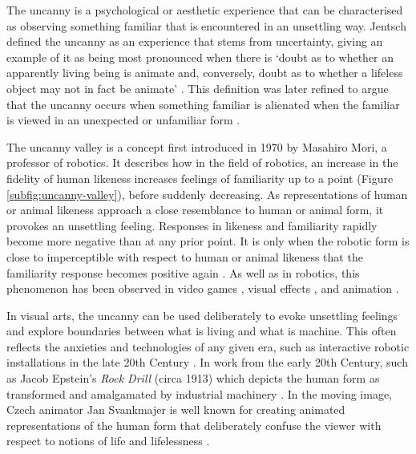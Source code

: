 The uncanny is a psychological or aesthetic experience that can be characterised as observing something familiar that is encountered in an unsettling way. 
Jentsch defined the uncanny as an experience that stems from uncertainty, giving an example of it as being most pronounced when there is `doubt as to whether an apparently living being is animate and, conversely, doubt as to whether a lifeless object may not in fact be animate' \citep{jentsch1906psychology}. 
This definition was later refined to argue that the uncanny occurs when something familiar is alienated when the familiar is viewed in an unexpected or unfamiliar form \citep{freud1919uncanny}.

The uncanny valley is a concept first introduced in 1970 by Masahiro Mori, a professor of robotics. 
It describes how in the field of robotics, an increase in the fidelity of human likeness increases feelings of familiarity up to a point (Figure \ref{subfig:uncanny-valley}), before suddenly decreasing. 
As representations of human or animal likeness approach a close resemblance to human or animal form, it provokes an unsettling feeling. 
Responses in likeness and familiarity rapidly become more negative than at any prior point. 
It is only when the robotic form is close to imperceptible with respect to human or animal likeness that the familiarity response becomes positive again \citep{mori1970uncanny}. 
As well as in robotics, this phenomenon has been observed in video games \citep{ratajczyk2019uncanny}, visual effects \citep{schwind2018avoiding}, and animation \citep{assaf2020presence}.

In visual arts, the uncanny can be used deliberately to evoke unsettling feelings and explore boundaries between what is living and what is machine. This often reflects the anxieties and technologies of any given era, such as interactive robotic installations in the late 20th Century \citep{tronstad2008uncanny}. 
In work from the early 20th Century, such as Jacob Epstein's \textit{Rock Drill} (circa 1913) which depicts the human form as transformed and amalgamated by industrial machinery \citep{grenville2001uncanny}. 
In the moving image, Czech animator Jan Svankmajer is well known for creating animated representations of the human form that deliberately confuse the viewer with respect to notions of life and lifelessness \citep{chryssouli2019alchemist}.

